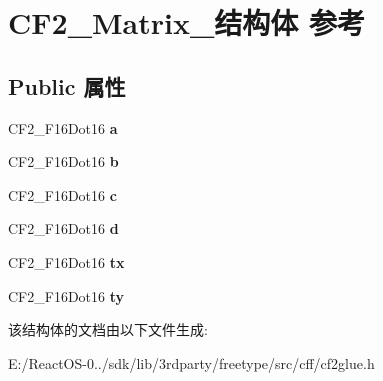 \hypertarget{struct_c_f2___matrix__}{}\section{C\+F2\+\_\+\+Matrix\+\_\+结构体 参考}
\label{struct_c_f2___matrix__}
\subsection*{Public 属性}
\begin{DoxyCompactItemize}
\item 
\mbox{\label{struct_c_f2___matrix___ab7ce8f1b965018e81ae9234f6223a35d}} 
C\+F2\+\_\+\+F16\+Dot16 {\bfseries a}
\item 
\mbox{\label{struct_c_f2___matrix___a4b253a3a8ba005ca02345bc2da237952}} 
C\+F2\+\_\+\+F16\+Dot16 {\bfseries b}
\item 
\mbox{\label{struct_c_f2___matrix___a0914a2e750a0f32938ad80c8631865a3}} 
C\+F2\+\_\+\+F16\+Dot16 {\bfseries c}
\item 
\mbox{\label{struct_c_f2___matrix___ac49530a76400a299ce223b3ba6ba3d6a}} 
C\+F2\+\_\+\+F16\+Dot16 {\bfseries d}
\item 
\mbox{\label{struct_c_f2___matrix___ad9135f53c387d621b81d92a469e7021d}} 
C\+F2\+\_\+\+F16\+Dot16 {\bfseries tx}
\item 
\mbox{\label{struct_c_f2___matrix___a99f30c33da0eb4a820aa31566b217e51}} 
C\+F2\+\_\+\+F16\+Dot16 {\bfseries ty}
\end{DoxyCompactItemize}


该结构体的文档由以下文件生成\+:\begin{DoxyCompactItemize}
\item 
E\+:/\+React\+O\+S-\/0../sdk/lib/3rdparty/freetype/src/cff/cf2glue.\+h\end{DoxyCompactItemize}
